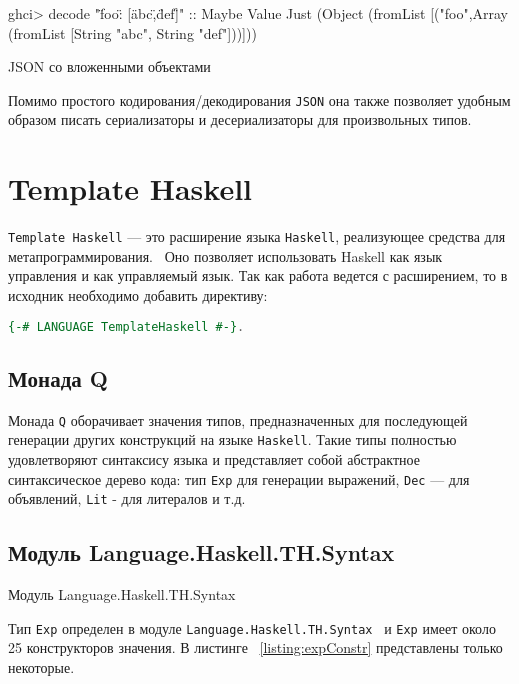 \begin{ListingEnv}[H]
\begin{Verb}
ghci> decode "{\"foo\": [\"abc\",\"def\"]}" :: Maybe Value
Just (Object (fromList [("foo",Array (fromList [String "abc", 
                                               String "def"]))]))
\end{Verb}
\caption{JSON со вложенными объектами}
\label{listing:astGetComp}
\end{ListingEnv}

Помимо простого кодирования/декодирования \lstinline{JSON} она также позволяет удобным образом писать сериализаторы и десериализаторы для произвольных типов.

\section{Template Haskell}

\lstinline{Template Haskell} --- это расширение языка \lstinline{Haskell}, реализующее средства для метапрограммирования.~\cite{extensionHub} Оно позволяет использовать Haskell как язык управления и как управляемый язык. Так как работа ведется с расширением, то в исходник необходимо добавить директиву:

\begin{lstlisting}[language=Haskell]
{-# LANGUAGE TemplateHaskell #-}.
\end{lstlisting}

\subsection{Монада Q}

Монада \lstinline{Q} оборачивает значения типов, предназначенных для последующей генерации других конструкций на языке \lstinline{Haskell}. Такие типы полностью удовлетворяют синтаксису языка и представляет собой абстрактное синтаксическое дерево кода: тип \lstinline{Exp} для генерации выражений, \lstinline{Dec} --- для объявлений, \lstinline{Lit} - для литералов и т.д.~\cite{thSyntax}

\subsection{Модуль Language.Haskell.TH.Syntax}

Модуль Language.Haskell.TH.Syntax

Тип \lstinline{Exp} определен в модуле \lstinline{Language.Haskell.TH.Syntax}~\cite{coverHaskell} и  \lstinline{Exp} имеет около 25 конструкторов значения. В листинге ~\ref{listing:expConstr} представлены только некоторые.  

